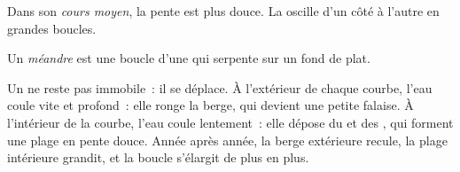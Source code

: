 Dans son \emph{cours moyen}, la pente est plus douce. La  oscille
d'un côté à l'autre en grandes boucles.

\begin{definition}[Méandre]\label{def:g5:water-shapes-the-land:meander}
Un \emph{méandre} est une boucle d'une  qui
serpente sur un fond de  plat.
\end{definition}

Un  ne reste pas immobile~: il se déplace. À l'extérieur de chaque
courbe, l'eau coule vite et profond~: elle ronge la berge, qui devient une
petite falaise. À l'intérieur de la courbe, l'eau coule lentement~: elle
dépose du  et des , qui forment une plage en pente douce.
Année après année, la berge extérieure recule, la plage intérieure grandit,
et la boucle s'élargit de plus en plus.

